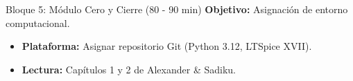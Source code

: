 \documentclass[aspectratio=169]{beamer}
\begin{document}
\begin{frame}{Bloque 5: Módulo Cero y Cierre (80 - 90 min)}
    \textbf{Objetivo:} Asignación de entorno computacional.
    \begin{itemize}
        \item \textbf{Plataforma:} Asignar repositorio Git (Python 3.12, LTSpice XVII).
        \item \textbf{Lectura:} Capítulos 1 y 2 de Alexander \& Sadiku.
    \end{itemize}
\end{frame}
\end{document}
